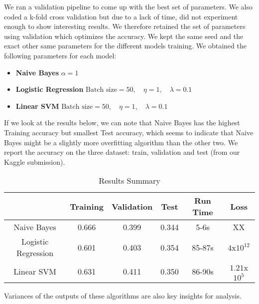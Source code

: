 \documentclass[11pt]{article}
\begin{document}
\noindent We ran a validation pipeline to come up with the best set of parameters. We also coded a k-fold cross validation but due to a lack of time, did not experiment enough to show interesting results. We therefore retained the set of parameters using validation which optimizes the accuracy. We kept the same seed and the exact other same parameters for the different models training. We obtained the following parameters for each model:

\begin{itemize}
	\item \textbf{Naive Bayes} $\alpha = 1$
	\item \textbf{Logistic Regression} $\text{Batch size} = 50,\quad \eta = 1, \quad \lambda = 0.1$
	\item \textbf{Linear SVM} $\text{Batch size} = 50,\quad \eta = 1, \quad \lambda = 0.1$\\
\end{itemize}

If we look at the results below, we can note that Naive Bayes has the highest Training accuracy but smallest Test accuracy, which seems to indicate that Naive Bayes might be a slightly more overfitting algorithm than the other two. We report the accuracy on the three dataset: train, validation and test (from our Kaggle submission).\\

\begin{table}[h!]
\centering
\caption{Results Summary}
\label{Results Summary}
\begin{tabular}{c|c|c|c|c|c|}
\cline{2-6}
\multicolumn{1}{l|}{}                     & Training & Validation & Test  & Run Time & Loss                      \\ \hline
\multicolumn{1}{|c|}{Naive Bayes}         & 0.666    & 0.399      & 0.344 & 5-6s     &    XX                       \\ \cline{1-1}
\multicolumn{1}{|c|}{Logistic Regression} & 0.601    & 0.403      & 0.354 & 85-87s   & $4$x$10^{12}$   \\ \cline{1-1}
\multicolumn{1}{|c|}{Linear SVM}          & 0.631    & 0.411      & 0.350 & 86-90s   & $1.21$x$10^5$ \\ \hline
\end{tabular}
\end{table}

Variances of the outputs of these algorithms are also key insights for analysis.\\
\end{document}
